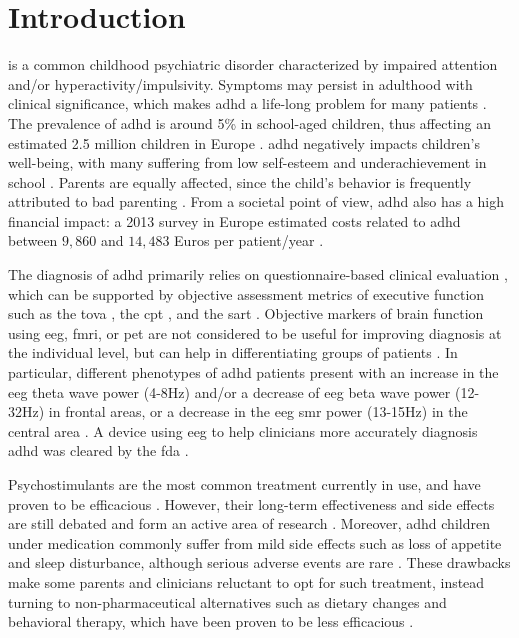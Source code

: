 

\section{Introduction} 

 is a common childhood psychiatric disorder characterized by impaired attention and/or hyperactivity/impulsivity.
Symptoms may persist in adulthood with clinical significance, which makes \gls{adhd} a life-long problem for many
patients \citep{Faraone2006}. The prevalence of \gls{adhd} is around 5\% in school-aged children, thus affecting an estimated
2.5 million children in Europe \citep{DSM-5}. \gls{adhd} negatively impacts children's well-being, with many suffering
from low self-esteem \citep{Shaw2005} and underachievement in school \citep{Barry2002}. Parents are equally affected, since 
the child's behavior is frequently attributed to bad parenting \citep{Harpin2005}. From a societal point
of view, \gls{adhd} also has a high financial impact: a 2013 survey in Europe estimated costs related to \gls{adhd} between $9,860$ and 
$14,483$ Euros per patient/year \citep{le2014}. 

The diagnosis of \gls{adhd} primarily relies on questionnaire-based clinical evaluation \citep{DSM-5}, which can be
supported by objective assessment metrics of executive function such as the \gls{tova} \citep{Forbes1998}, the
\gls{cpt} \citep{Barkley1991}, and the \gls{sart} \citep{Robertson1997}. Objective markers of brain function
using \gls{eeg}, \gls{fmri}, or \gls{pet} are not considered to be useful for improving diagnosis at the individual
level, but can help in differentiating groups of patients \citep{Johnstone2005}.  
In particular, different phenotypes of \gls{adhd} patients present with an increase in the \gls{eeg} theta wave 
power (4-8Hz) and/or a decrease of \gls{eeg} beta wave power (12-32Hz) in frontal areas, or a decrease in the \gls{eeg} 
\gls{smr} power (13-15Hz) in the central area \citep{Monastra2005, Matouvsek1984, Janzen1995, loo2017}. A device 
using \gls{eeg} to help clinicians more accurately diagnosis \gls{adhd} was cleared by the \gls{fda} \citep{Neba}. 

Psychostimulants are the most common treatment currently in use, and have proven to be efficacious
\citep{Taylor2014, Storebo2015}. However, their long-term effectiveness and side effects are still debated and form 
an active area of research \citep{DuPaul1998, Swanson2001, Jensen1999, Su2016, Becker2016}. Moreover, \gls{adhd} children under medication 
commonly suffer from mild side effects such as loss of appetite and sleep disturbance, although serious adverse events
are rare \citep{Storebo2015, Cooper2011}. These drawbacks make some parents and clinicians reluctant to 
opt for such treatment, instead turning to non-pharmaceutical alternatives such as dietary changes \citep{Belanger2009} and behavioral 
therapy, which have been proven to be less efficacious \citep{Sonuga-Barke2013}.

